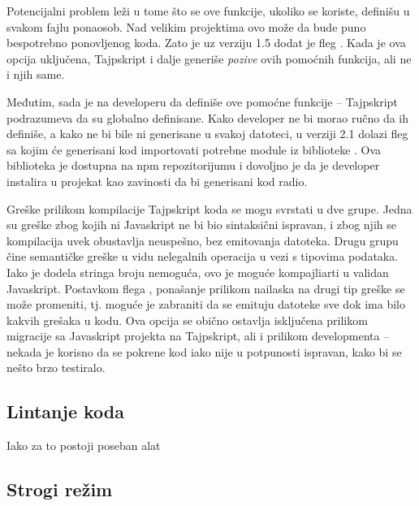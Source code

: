 Potencijalni problem leži u tome što se ove funkcije, ukoliko se koriste, definišu u svakom fajlu ponaosob.
Nad velikim projektima ovo može da bude puno bespotrebno ponovljenog koda.
Zato je uz verziju 1.5 dodat je fleg .
Kada je ova opcija uključena, Tajpskript i dalje generiše \textit{pozive} ovih pomoćnih funkcija, ali ne i njih same.

Međutim, sada je na developeru da definiše ove pomoćne funkcije -- Tajpskript podrazumeva da su globalno definisane.
Kako developer ne bi morao ručno da ih definiše, a kako ne bi bile ni generisane u svakoj datoteci, u verziji 2.1 dolazi fleg  sa kojim će generisani kod importovati potrebne module iz biblioteke .
Ova biblioteka je dostupna na npm repozitorijumu i dovoljno je da je developer instalira u projekat kao zavinosti da bi generisani kod radio.

Greške prilikom kompilacije Tajpskript koda se mogu svrstati u dve grupe.
Jedna su greške zbog kojih ni Javaskript ne bi bio sintaksični ispravan, i zbog njih se kompilacija uvek obustavlja neuspešno, bez emitovanja datoteka.
Drugu grupu čine semantičke greške u vidu nelegalnih operacija u vezi s tipovima podataka.
Iako je dodela stringa broju nemoguća, ovo je moguće kompajliarti u validan Javaskript.
Postavkom flega , ponašanje prilikom nailaska na drugi tip greške se može promeniti, tj. moguće je zabraniti da se emituju  datoteke sve dok ima bilo kakvih grešaka u  kodu.
Ova opcija se obično ostavlja isključena prilikom migracije sa Javaskript projekta na Tajpskript, ali i prilikom developmenta -- nekada je korisno da se pokrene kod iako nije u potpunosti ispravan, kako bi se nešto brzo testiralo.

\subsection{Lintanje koda}

Iako za to postoji poseban alat

\subsection{Strogi režim}

